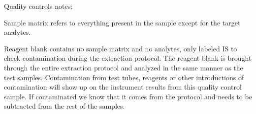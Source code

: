 Quality controls notes:

Sample matrix refers to everything present in the sample except for the target analytes. 

Reagent blank contains no sample matrix and no analytes, only labeled IS to check contamination during the extraction protocol. The reagent blank is brought through the entire extraction protocol and analyzed in the same manner as the test samples. Contamination from test tubes, reagents or other introductions of contamination will show up on the instrument results from this quality control sample. If contaminated we know that it comes from the protocol and needs to be subtracted from the rest of the samples. 